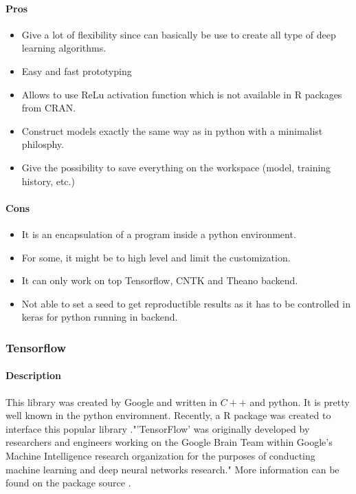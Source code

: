 \documentclass[letter,8pt]{article}\usepackage[]{graphicx}\usepackage[]{color}
\begin{document}
\paragraph{Pros}
\begin{itemize}
\item Give a lot of flexibility since can basically be use to create all type of deep learning algorithms.
\item Easy and fast prototyping
\item Allows to use ReLu activation function which is not available in R packages from CRAN.
\item Construct models exactly the same way as in python with a minimalist philosphy.
\item Give the possibility to save everything on the workspace (model, training history, etc.)
\end{itemize}
\paragraph{Cons}
\begin{itemize}
\item It is an encapsulation of a program inside a python environment.
\item For some, it might be to high level and limit the customization.
\item It can only work on top Tensorflow, CNTK and Theano backend.
\item Not able to set a seed to get reproductible results as it has to be controlled in keras for python running in backend.
\end{itemize}

\subsubsection{Tensorflow}
\paragraph{Description}
This library was created by Google and written in $C++$ and python. It is pretty well known in the python enviromnent. Recently, a R package was created to interface this popular library ."'TensorFlow' was originally developed by researchers and engineers working on the Google Brain Team within Google's Machine Intelligence research organization for the purposes of conducting machine learning and deep neural networks research." More information can be found on the package source \cite{tensorflow2019}.
\end{document}
